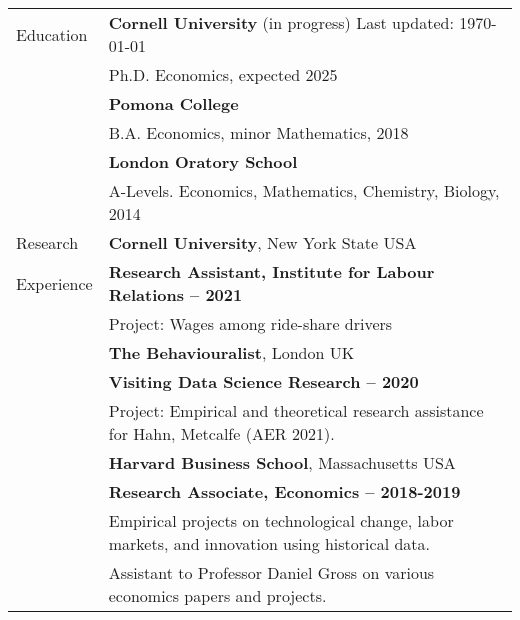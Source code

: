 \documentclass[letterpaper,11pt,oneside]{article}
\begin{document}
\noindent \begin{longtable}{@{} l l}
\Large{Education}
    & \textbf{Cornell University} (in progress)  \hfill Last updated: \today \\
    &  Ph.D. Economics, expected 2025 \vspace{0.1cm} \\
    & \textbf{Pomona College} \\
    &  B.A. Economics, minor Mathematics, 2018 \\
    &  \textbf{London Oratory School}\\
    &  A-Levels. Economics, Mathematics, Chemistry, Biology, 2014 \vspace{0.2cm} \\

\Large{Research}
    & \textbf{Cornell University}, New York State USA \\
\Large{Experience}
    & \textbf{Research Assistant, Institute for Labour Relations -- 2021} \\
    & Project: Wages among ride-share drivers \vspace{0.2cm} \\
    
    & \textbf{The Behaviouralist}, London UK \\
    & \textbf{Visiting Data Science Research -- 2020} \\
    & Project: Empirical and theoretical research assistance for Hahn, Metcalfe (AER 2021). \vspace{0.2cm} \\

    & \textbf{Harvard Business School}, Massachusetts USA \\
    & \textbf{Research Associate, Economics -- 2018-2019} \\
    & Empirical projects on technological change, labor markets, and innovation using historical data.\\
    & Assistant to Professor Daniel Gross on various economics papers and projects. \vspace{0.2cm} \\


\end{longtable}
\end{document}
